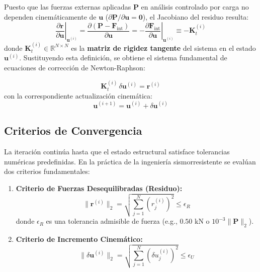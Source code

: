 \documentclass[11pt,letterpaper]{article}
\begin{document}
Puesto que las fuerzas externas aplicadas $\mathbf{P}$ en análisis controlado por carga no dependen cinemáticamente de $\mathbf{u}$ ($\partial \mathbf{P} / \partial \mathbf{u} = \mathbf{0}$), el Jacobiano del residuo resulta:
\begin{equation}
    \left.\frac{\partial \mathbf{r}}{\partial \mathbf{u}}\right|_{\mathbf{u}^{(i)}} = \frac{\partial \left(\mathbf{P} - \mathbf{F}_{\text{int}}\right)}{\partial \mathbf{u}} = -\left.\frac{\partial \mathbf{F}_{\text{int}}}{\partial \mathbf{u}}\right|_{\mathbf{u}^{(i)}} \equiv -\mathbf{K}_t^{(i)}
\end{equation}
donde $\mathbf{K}_t^{(i)} \in \mathbb{R}^{N \times N}$ es la \textbf{matriz de rigidez tangente} del sistema en el estado $\mathbf{u}^{(i)}$. Sustituyendo esta definición, se obtiene el sistema fundamental de ecuaciones de corrección de Newton-Raphson:

\begin{conceptbox}
\begin{equation}
    \label{eq:NR_system}
    \mathbf{K}_t^{(i)} \, \delta \mathbf{u}^{(i)} = \mathbf{r}^{(i)}
\end{equation}
con la correspondiente actualización cinemática:
\begin{equation}
    \label{eq:kinematic_update}
    \mathbf{u}^{(i+1)} = \mathbf{u}^{(i)} + \delta \mathbf{u}^{(i)}
\end{equation}
\end{conceptbox}

\subsection{Criterios de Convergencia}

La iteración continúa hasta que el estado estructural satisface tolerancias numéricas predefinidas. En la práctica de la ingeniería sismorresistente se evalúan dos criterios fundamentales:
\begin{enumerate}
    \item \textbf{Criterio de Fuerzas Desequilibradas (Residuo):}
    \begin{equation}
        \|\mathbf{r}^{(i)}\|_2 = \sqrt{\sum_{j=1}^N \left(r_j^{(i)}\right)^2} \le \epsilon_R
    \end{equation}
    donde $\epsilon_R$ es una tolerancia admisible de fuerza (e.g., $0.50\text{ kN}$ o $10^{-3} \|\mathbf{P}\|_2$).
    
    \item \textbf{Criterio de Incremento Cinemático:}
    \begin{equation}
        \|\delta \mathbf{u}^{(i)}\|_2 = \sqrt{\sum_{j=1}^N \left(\delta u_j^{(i)}\right)^2} \le \epsilon_U
    \end{equation}
\end{enumerate}
\end{document}
